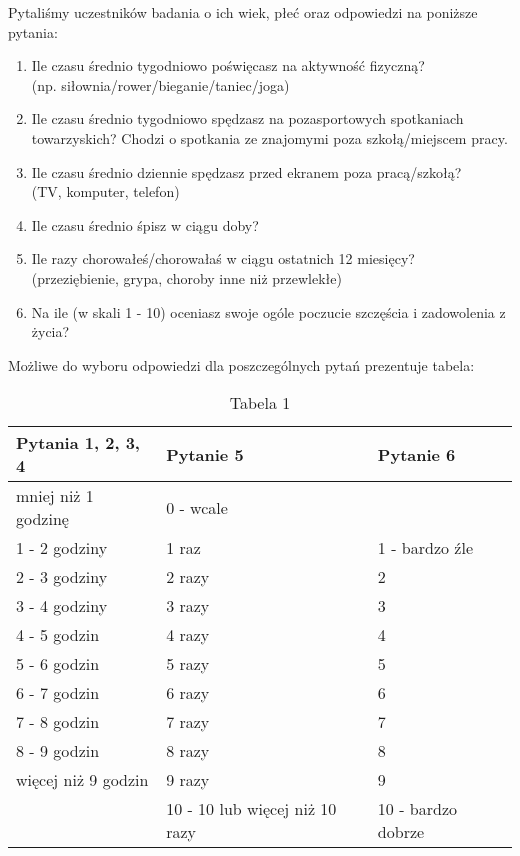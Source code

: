 \documentclass[12pt,a4paper]{article}
\begin{document}
\newpage
Pytaliśmy uczestników badania o ich wiek, płeć oraz odpowiedzi na poniższe pytania:
\begin{enumerate}
    \item {Ile czasu średnio tygodniowo poświęcasz na aktywność fizyczną? \\ (np. siłownia/rower/bieganie/taniec/joga)}
    \item Ile czasu średnio tygodniowo spędzasz na pozasportowych spotkaniach towarzyskich? Chodzi o spotkania ze znajomymi poza szkołą/miejscem pracy.
    \item {Ile czasu średnio dziennie spędzasz przed ekranem poza pracą/szkołą? \\ 
    (TV, komputer, telefon)}
    \item Ile czasu średnio śpisz w ciągu doby?
    \item {Ile razy chorowałeś/chorowałaś w ciągu ostatnich 12 miesięcy? \\
    (przeziębienie, grypa, choroby inne niż przewlekłe)}
    \item Na ile (w skali 1 - 10) oceniasz swoje ogóle poczucie szczęścia i zadowolenia z życia?
\end{enumerate}
\vspace{4mm}

Możliwe do wyboru odpowiedzi dla poszczególnych pytań prezentuje tabela:
\begin{table}[h]
    \centering
    \begin{tabular}{|l|l|l|}
        \hline \textbf{Pytania 1, 2, 3, 4} & \textbf{Pytanie 5} & \textbf{Pytanie 6} \\ \hline 
        mniej niż 1 godzinę & 0 - wcale &\\ \hline
        1 - 2 godziny & 1 raz & 1 - bardzo źle \\ \hline
        2 - 3 godziny & 2 razy & 2 \\ \hline
        3 - 4 godziny & 3 razy & 3 \\ \hline
        4 - 5 godzin & 4 razy & 4 \\ \hline
        5 - 6 godzin & 5 razy & 5 \\ \hline
        6 - 7 godzin & 6 razy & 6 \\ \hline
        7 - 8 godzin & 7 razy & 7 \\ \hline
        8 - 9 godzin & 8 razy & 8 \\ \hline
        więcej niż 9 godzin & 9 razy & 9 \\ \hline
         & 10 - 10 lub więcej niż 10 razy & 10 - bardzo dobrze \\ \hline
    \end{tabular}
    \caption*{Tabela 1}
\end{table}
\end{document}
